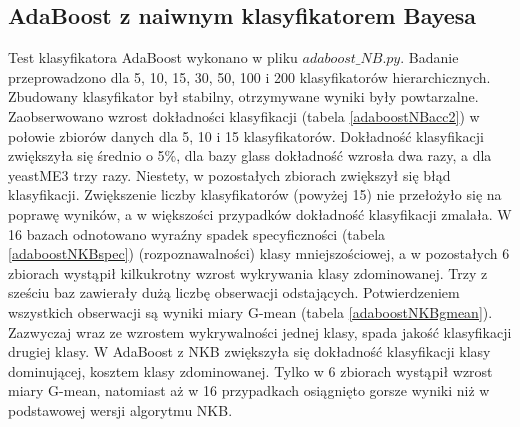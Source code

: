 \subsection{AdaBoost z naiwnym klasyfikatorem Bayesa}
Test klasyfikatora AdaBoost wykonano w pliku $adaboost\_NB.py$. Badanie przeprowadzono dla 5, 10, 15, 30, 50, 100 i 200 klasyfikatorów hierarchicznych. Zbudowany klasyfikator był stabilny, otrzymywane wyniki były powtarzalne. Zaobserwowano wzrost dokładności klasyfikacji (tabela \ref{adaboostNBacc2}) w połowie zbiorów danych dla 5, 10 i 15 klasyfikatorów. Dokładność klasyfikacji zwiększyła się średnio o 5\%, dla bazy glass dokładność wzrosła dwa razy, a dla yeastME3 trzy razy. Niestety, w pozostałych zbiorach zwiększył się błąd klasyfikacji. Zwiększenie liczby klasyfikatorów (powyżej 15) nie przełożyło się na poprawę wyników, a w większości przypadków dokładność klasyfikacji zmalała. W 16 bazach odnotowano wyraźny spadek specyficzności (tabela \ref{adaboostNKBspec}) (rozpoznawalności) klasy mniejszościowej, a w pozostałych 6 zbiorach wystąpił kilkukrotny wzrost wykrywania klasy zdominowanej. Trzy z sześciu baz zawierały dużą liczbę obserwacji odstających. Potwierdzeniem wszystkich obserwacji są wyniki miary G-mean (tabela \ref{adaboostNKBgmean}). Zazwyczaj wraz ze wzrostem wykrywalności jednej klasy, spada jakość klasyfikacji drugiej klasy. W AdaBoost z NKB zwiększyła się dokładność klasyfikacji klasy dominującej, kosztem klasy zdominowanej. Tylko w 6 zbiorach wystąpił wzrost miary G-mean, natomiast aż w 16 przypadkach osiągnięto gorsze wyniki niż w podstawowej wersji algorytmu NKB.
